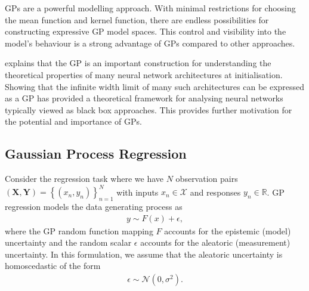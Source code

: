 \documentclass{article}
\numberwithin{equation}{section}
\begin{document}
GPs are a powerful modelling approach. With minimal restrictions for choosing the mean function and kernel function, there are endless possibilities for constructing expressive GP model spaces. 
This control and visibility into the model's behaviour is a strong advantage of GPs compared to other approaches. 

\cite{novak2019neural} explains that the GP is an important construction for understanding the theoretical properties of many neural network architectures at initialisation. 
Showing that the infinite width limit of many such architectures can be expressed as a GP has provided a theoretical framework for analysing neural networks typically viewed as black box approaches. 
This provides further motivation for the potential and importance of GPs.

\subsection{Gaussian Process Regression}
Consider the regression task where we have $N$ observation pairs $(\mathbf{X}, \mathbf{Y}) = \left\{(x_n, y_n)\right\}_{n=1}^{N}$ with inputs $x_n \in \mathcal{X}$ and responses $y_n \in \mathbb{R}$. GP regression models the data generating process as
\begin{align}
    y \sim F(x) + \epsilon,
    \label{regression-data-uncertainties}
\end{align}
where the GP random function mapping $F$ accounts for the epistemic (model) uncertainty and the random scalar $\epsilon$ accounts for the aleatoric (measurement) uncertainty. In this formulation, we assume that the aleatoric uncertainty is homoscedastic of the form
\begin{align}
    \epsilon \sim \mathcal{N} \left(0, \sigma^2\right).
    \label{aleotric-uncertainty}
\end{align}
\end{document}
